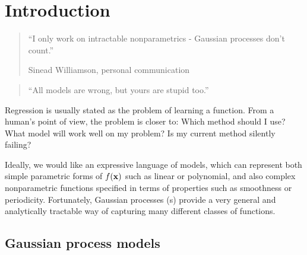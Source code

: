 
\inbpdocument

\chapter{Introduction}
\label{ch:intro}


\begin{quotation}
``I only work on intractable nonparametrics - Gaussian processes don't count.''

\hspace*{\fill} Sinead Williamson, personal communication
\end{quotation}


\begin{quotation}
``All models are wrong, but yours are stupid too.''

\hspace*{\fill} \citet{mlhipster} %
\end{quotation}

\nomenclature[g-pi]{$\pi$}{ $\simeq 3.14\ldots$}


Regression is usually stated as the problem of learning a function.
%
From a human's point of view, the problem is closer to: Which method should I use?  What model will work well on my problem?  Is my current method silently failing?


Ideally, we would like an expressive language of models, which can represent both simple parametric forms of $f({\bf{x}})$ such as linear or polynomial, and also complex nonparametric functions specified in terms of properties such as smoothness or periodicity.
Fortunately, Gaussian processes (\gp{}s) provide a very general and analytically tractable way of capturing many different classes of functions.



\section{Gaussian process models}

